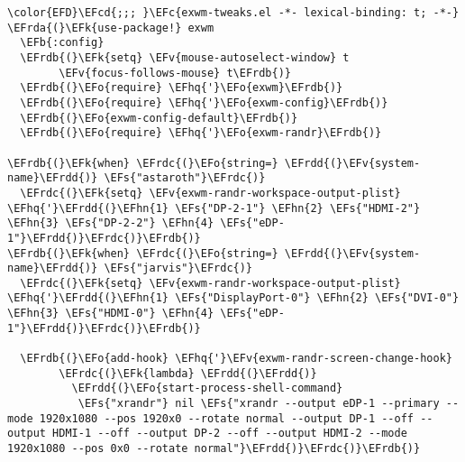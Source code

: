 \documentclass[a4wide,10pt]{article}
\newcommand{\EFc}[1]{\textcolor{EFc}{#1}} %
\newcommand{\EFcd}[1]{\textcolor{EFcd}{#1}} %
\newcommand{\EFs}[1]{\textcolor{EFs}{#1}} %
\newcommand{\EFk}[1]{\textcolor{EFk}{#1}} %
\newcommand{\EFb}[1]{\textcolor{EFb}{#1}} %
\newcommand{\EFv}[1]{\textcolor{EFv}{#1}} %
\newcommand{\EFo}[1]{\textcolor{EFo}{#1}} %
\newcommand{\EFhn}[1]{\textcolor{EFhn}{\textbf{#1}}} %
\newcommand{\EFhq}[1]{\textcolor{EFhq}{#1}} %
\newcommand{\EFrda}[1]{\textcolor{EFrda}{#1}} %
\newcommand{\EFrdb}[1]{\textcolor{EFrdb}{#1}} %
\newcommand{\EFrdc}[1]{\textcolor{EFrdc}{#1}} %
\newcommand{\EFrdd}[1]{\textcolor{EFrdd}{#1}} %
\begin{document}
\begin{Code}
\begin{Verbatim}
\color{EFD}\EFcd{;;; }\EFc{exwm-tweaks.el -*- lexical-binding: t; -*-}
\EFrda{(}\EFk{use-package!} exwm
  \EFb{:config}
  \EFrdb{(}\EFk{setq} \EFv{mouse-autoselect-window} t
        \EFv{focus-follows-mouse} t\EFrdb{)}
  \EFrdb{(}\EFo{require} \EFhq{'}\EFo{exwm}\EFrdb{)}
  \EFrdb{(}\EFo{require} \EFhq{'}\EFo{exwm-config}\EFrdb{)}
  \EFrdb{(}\EFo{exwm-config-default}\EFrdb{)}
  \EFrdb{(}\EFo{require} \EFhq{'}\EFo{exwm-randr}\EFrdb{)}

\EFrdb{(}\EFk{when} \EFrdc{(}\EFo{string=} \EFrdd{(}\EFv{system-name}\EFrdd{)} \EFs{"astaroth"}\EFrdc{)}
  \EFrdc{(}\EFk{setq} \EFv{exwm-randr-workspace-output-plist} \EFhq{'}\EFrdd{(}\EFhn{1} \EFs{"DP-2-1"} \EFhn{2} \EFs{"HDMI-2"} \EFhn{3} \EFs{"DP-2-2"} \EFhn{4} \EFs{"eDP-1"}\EFrdd{)}\EFrdc{)}\EFrdb{)}
\EFrdb{(}\EFk{when} \EFrdc{(}\EFo{string=} \EFrdd{(}\EFv{system-name}\EFrdd{)} \EFs{"jarvis"}\EFrdc{)}
  \EFrdc{(}\EFk{setq} \EFv{exwm-randr-workspace-output-plist} \EFhq{'}\EFrdd{(}\EFhn{1} \EFs{"DisplayPort-0"} \EFhn{2} \EFs{"DVI-0"} \EFhn{3} \EFs{"HDMI-0"} \EFhn{4} \EFs{"eDP-1"}\EFrdd{)}\EFrdc{)}\EFrdb{)}

  \EFrdb{(}\EFo{add-hook} \EFhq{'}\EFv{exwm-randr-screen-change-hook}
	    \EFrdc{(}\EFk{lambda} \EFrdd{(}\EFrdd{)}
	      \EFrdd{(}\EFo{start-process-shell-command}
	       \EFs{"xrandr"} nil \EFs{"xrandr --output eDP-1 --primary --mode 1920x1080 --pos 1920x0 --rotate normal --output DP-1 --off --output HDMI-1 --off --output DP-2 --off --output HDMI-2 --mode 1920x1080 --pos 0x0 --rotate normal"}\EFrdd{)}\EFrdc{)}\EFrdb{)}


\end{Verbatim}
\end{Code}
\end{document}
